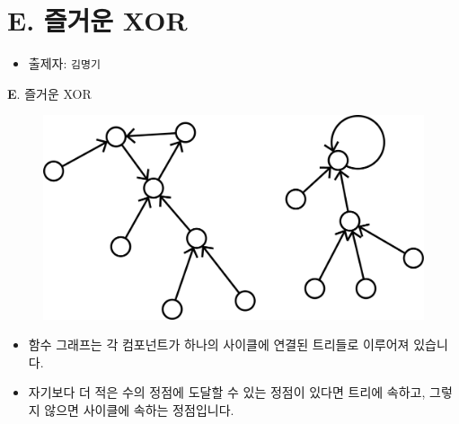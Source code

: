 \section{E. 즐거운 XOR}

\begin{frame} %
    \begin{itemize}
        \item 출제자: \texttt{김명기}
    \end{itemize}
\end{frame}

\begin{frame}{\textbf{E}. 즐거운 XOR}
    \begin{figure}[h!]
        \centering
        \includegraphics[width=0.5\linewidth]{../images/function-restore/fx-1n.png}
    \end{figure}
    \begin{itemize}
        \item 함수 그래프는 각 컴포넌트가 하나의 사이클에 연결된 트리들로 이루어져 있습니다.
        \item 자기보다 더 적은 수의 정점에 도달할 수 있는 정점이 있다면 트리에 속하고, 그렇지 않으면 사이클에 속하는 정점입니다.
    \end{itemize}
\end{frame}